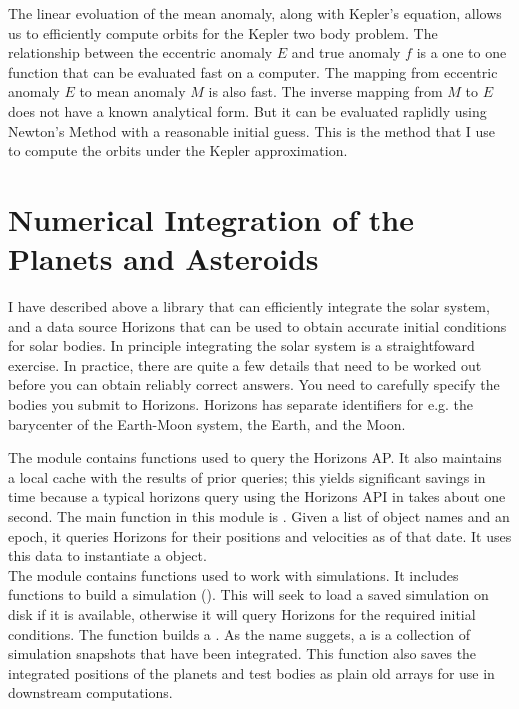 The linear evoluation of the mean anomaly, along with Kepler's equation, allows us to efficiently compute orbits for the Kepler two body problem.
The relationship between the eccentric anomaly $E$ and true anomaly $f$ is a one to one function that can be evaluated fast on a computer.
The mapping from eccentric anomaly $E$ to mean anomaly $M$ is also fast.
The inverse mapping from $M$ to $E$ does not have a known analytical form.
But it can be evaluated raplidly using Newton's Method with a reasonable initial guess.
This is the method that I use to compute the orbits under the Kepler approximation. 

\section{Numerical Integration of the Planets and Asteroids}
\label{section_numerical_integration}

I have described above a library  that can efficiently integrate the solar system,
and a data source Horizons that can be used to obtain accurate initial conditions for solar bodies.
In principle integrating the solar system is a straightfoward exercise.
In practice, there are quite a few details that need to be worked out before you can obtain reliably correct answers.
You need to carefully specify the bodies you submit to Horizons.
Horizons has separate identifiers for e.g. the barycenter of the Earth-Moon system, the Earth, and the Moon.

The module  contains functions used to query the Horizons AP.
It also maintains a local cache with the results of prior queries; 
this yields significant savings in time because a typical horizons query using the Horizons API in  takes about one second.
The main function in this module is .
Given a list of object names and an epoch, it queries Horizons for their positions and velocities as of that date.
It uses this data to instantiate a  object. \\
The module  contains functions used to work with  simulations.
It includes functions to build a simulation ().
This will seek to load a saved simulation on disk if it is available, otherwise it will query Horizons for the required initial conditions.
The function  builds a .
As the name suggets, a  is a collection of simulation snapshots that  have been integrated.
This function also saves the integrated positions of the planets and test bodies as plain old  arrays for use in downstream computations.

